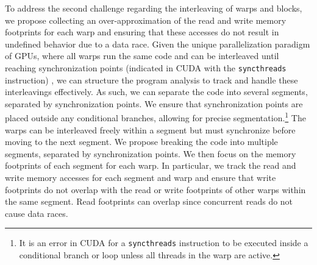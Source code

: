 To address the second challenge regarding the interleaving of warps and blocks, we propose collecting an over-approximation of the read and write memory footprints for each warp and ensuring that these accesses do not result in undefined behavior due to a data race.
%
Given the unique parallelization paradigm of GPUs, where all warps run the same code and can be interleaved until reaching synchronization points (indicated in CUDA with the \texttt{syncthreads} instruction) , we can structure the program analysis to track and handle these interleavings effectively.
As such, we can separate the code into several segments, separated by synchronization points.
%
We ensure that synchronization points are placed outside any conditional branches, allowing for precise segmentation.\footnote{It is an error in CUDA for a
\texttt{syncthreads} instruction to be executed inside a conditional branch or loop unless all threads in the warp are active.}
%
The warps can be interleaved freely within a segment but must synchronize before moving to the next segment.
We propose breaking the code into multiple segments, separated by synchronization points.
%
We then focus on the memory footprints of each segment for each warp. 
%
In particular, we track the read and write memory accesses for each segment and warp and ensure that write footprints do not overlap with the read or write footprints of other warps within the same segment. 
%
Read footprints can overlap since concurrent reads do not cause data races.
%


%

%
%
%
%
%
%
%


